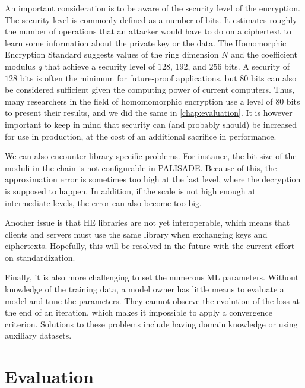 \documentclass[a4paper,11pt,oneside]{report}
\begin{document}
An important consideration is to be aware of the security level of the encryption. 
The security level is commonly defined as a number of bits. 
It estimates roughly the number of operations that an attacker would have to do on a ciphertext to learn some information about the private key or the data.
The Homomorphic Encryption Standard \cite{albrecht_homomorphic_2021} suggests values of the ring dimension $N$ and the coefficient modulus $q$ that achieve a security level of $128$, $192$, and $256$ bits. 
A security of $128$ bits is often the minimum for future-proof applications, but $80$ bits can also be considered sufficient given the computing power of current computers.
Thus, many researchers in the field of homomomorphic encryption use a level of $80$ bits to present their results, and we did the same in \autoref{chap:evaluation}.
It is however important to keep in mind that security can (and probably should) be increased for use in production, at the cost of an additional sacrifice in performance.

We can also encounter library-specific problems. 
For instance, the bit size of the moduli in the chain is not configurable in PALISADE. 
Because of this, the approximation error is sometimes too high at the last level, where the decryption is supposed to happen.
In addition, if the scale is not high enough at intermediate levels, the error can also become too big.

Another issue is that HE libraries are not yet interoperable, which means that clients and servers must use the same library when exchanging keys and ciphertexts. 
Hopefully, this will be resolved in the future with the current effort on standardization.

Finally, it is also more challenging to set the numerous ML parameters.
Without knowledge of the training data, a model owner has little means to evaluate a model and tune the parameters.
They cannot observe the evolution of the loss at the end of an iteration, which makes it impossible to apply a convergence criterion.
Solutions to these problems include having domain knowledge or using auxiliary datasets.


\chapter{Evaluation}\label{chap:evaluation}

\end{document}
